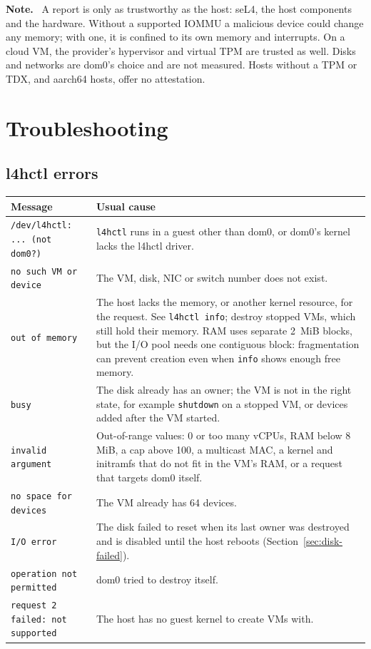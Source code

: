 \documentclass[11pt,a4paper]{report}
\newcommand{\cmd}[1]{\texttt{#1}}
\newenvironment{caveat}{\par\medskip\noindent\color{note}\textbf{Note.}\ }{\par\medskip}
\begin{document}
\begin{caveat}
A report is only as trustworthy as the host: seL4, the host components and
the hardware. Without a supported IOMMU a malicious device could change any
memory; with one, it is confined to its own memory and interrupts. On a cloud VM, the provider's hypervisor and virtual TPM are
trusted as well. Disks and networks are dom0's choice and are not measured.
Hosts without a TPM or TDX, and aarch64 hosts, offer no attestation.
\end{caveat}

\chapter{Troubleshooting}
\label{ch:trouble}

\section{l4hctl errors}
\label{sec:errors}

\begin{longtable}{@{}p{4.3cm}p{10.2cm}@{}}
\toprule
Message & Usual cause \\
\midrule
\endhead
\texttt{/dev/l4hctl: ... (not dom0?)} & \cmd{l4hctl} runs in a guest other
  than dom0, or dom0's kernel lacks the l4hctl driver. \\
\texttt{no such VM or device} & The VM, disk, NIC or switch number does not
  exist. \\
\texttt{out of memory} & The host lacks the memory, or another kernel
  resource, for the request. See \cmd{l4hctl info}; destroy stopped VMs,
  which still hold their memory. RAM uses separate 2~MiB blocks, but the
  I/O pool needs one contiguous block: fragmentation can prevent creation
  even when \cmd{info} shows enough free memory. \\
\texttt{busy} & The disk already has an owner; the VM is not in the right
  state, for example \cmd{shutdown} on a stopped VM, or devices added
  after the VM started. \\
\texttt{invalid argument} & Out-of-range values: 0 or too many vCPUs, RAM
  below 8 MiB, a cap above 100, a multicast MAC, a kernel and initramfs that do not fit in the VM's RAM, or a request
  that targets dom0 itself. \\
\texttt{no space for devices} & The VM already has 64 devices. \\
\texttt{I/O error} & The disk failed to reset when its last owner was
  destroyed and is disabled until the host reboots
  (Section~\ref{sec:disk-failed}). \\
\texttt{operation not permitted} & dom0 tried to destroy itself. \\
\texttt{request 2 failed: not supported} & The host has no guest
  kernel to create VMs with. \\
\bottomrule
\end{longtable}
\end{document}
